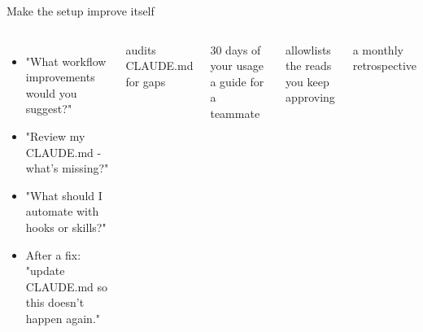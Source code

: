 \documentclass[aspectratio=169,11pt,t]{beamer}
\begin{document}
\begin{frame}{Make the setup improve itself}
  \begin{columns}[T,onlytextwidth]
      \par\vspace{0.35em}
      \begin{itemize}\small\setlength\itemsep{0.3em}
        \item "What workflow improvements would you suggest?"
        \item "Review my CLAUDE.md - what's missing?"
        \item "What should I automate with hooks or skills?"
        \item After a fix: "update CLAUDE.md so this doesn't happen again."
      \end{itemize}
      \par\vspace{0.35em}
      \small
      \par{\footnotesize\color{muted}audits CLAUDE.md for gaps}\par\vspace{0.25em}
      \par{\footnotesize\color{muted}30 days of your usage \ra{} a guide for a teammate}\par\vspace{0.25em}
      \par{\footnotesize\color{muted}allowlists the reads you keep approving}\par\vspace{0.25em}
      \par{\footnotesize\color{muted}a monthly retrospective}
  \end{columns}
\end{frame}
\end{document}
